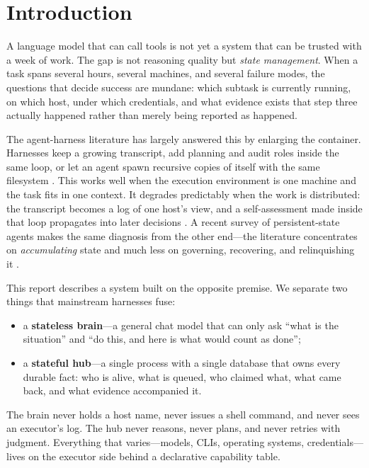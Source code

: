 \documentclass{article}
\begin{document}
\section{Introduction}

A language model that can call tools is not yet a system that can be trusted with a
week of work. The gap is not reasoning quality but \emph{state management}. When a
task spans several hours, several machines, and several failure modes, the questions
that decide success are mundane: which subtask is currently running, on which host,
under which credentials, and what evidence exists that step three actually happened
rather than merely being reported as happened.

The agent-harness literature has largely answered this by enlarging the container.
Harnesses keep a growing transcript, add planning and audit roles inside the same
loop, or let an agent spawn recursive copies of itself with the same filesystem
\cite{longhorizon2026,raharness2026,onedayagent2026}. This works well when the
execution environment is one machine and the task fits in one context. It degrades
predictably when the work is distributed: the transcript becomes a log of one host's
view, and a self-assessment made inside that loop propagates into later decisions
\cite{longhorizon2026}. A recent survey of persistent-state agents makes the same
diagnosis from the other end---the literature concentrates on \emph{accumulating}
state and much less on governing, recovering, and relinquishing it
\cite{alwayson2026}.

This report describes a system built on the opposite premise. We separate two things
that mainstream harnesses fuse:

\begin{itemize}[leftmargin=1.2em,itemsep=2pt,topsep=3pt]
  \item a \textbf{stateless brain}---a general chat model that can only ask ``what is
        the situation'' and ``do this, and here is what would count as done'';
  \item a \textbf{stateful hub}---a single process with a single database that owns
        every durable fact: who is alive, what is queued, who claimed what, what came
        back, and what evidence accompanied it.
\end{itemize}

The brain never holds a host name, never issues a shell command, and never sees an
executor's log. The hub never reasons, never plans, and never retries with judgment.
Everything that varies---models, CLIs, operating systems, credentials---lives on the
executor side behind a declarative capability table.
\end{document}

